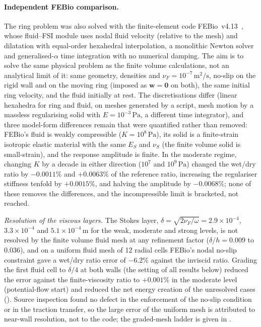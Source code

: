 \paragraph{Independent FEBio comparison.}
The ring problem was also solved with the finite-element code FEBio~v4.13~\citep{Maas2012,Ateshian2018,Shim2019}, whose fluid--FSI module uses nodal fluid velocity (relative to the mesh) and dilatation with equal-order hexahedral interpolation, a monolithic Newton solver and generalised-$\alpha$ time integration with no numerical damping.
The aim is to solve the same physical problem as the finite volume calculations, not an analytical limit of it: same geometry, densities and $\nu_F=10^{-7}\,\mathrm{m^2/s}$, no-slip on the rigid wall and on the moving ring (imposed as $\bm{w}=\bm{0}$ on both), the same initial ring velocity, and the fluid initially at rest.
The discretisations differ (linear hexahedra for ring and fluid, on meshes generated by a script, mesh motion by a massless regularising solid with $E=10^{-3}\,\mathrm{Pa}$, a different time integrator), and three model-form differences remain that were quantified rather than removed: FEBio's fluid is weakly compressible ($K=10^{8}\,\mathrm{Pa}$), its solid is a finite-strain isotropic elastic material with the same $E_S$ and $\nu_S$ (the finite volume solid is small-strain), and the response amplitude is finite.
In the moderate regime, changing $K$ by a decade in either direction ($10^{7}$ and $10^{9}\,\mathrm{Pa}$) changed the wet/dry ratio by $-0.0011\%$ and $+0.0063\%$ of the reference ratio, increasing the regulariser stiffness tenfold by $+0.0015\%$, and halving the amplitude by $-0.0068\%$; none of these removes the differences, and the incompressible limit is bracketed, not reached.

\emph{Resolution of the viscous layers.}
The Stokes layer, $\delta=\sqrt{2\nu_F/\omega}=2.9\times10^{-4}$, $3.3\times10^{-4}$ and $5.1\times10^{-4}\,\mathrm{m}$ for the weak, moderate and strong levels, is not resolved by the finite volume fluid mesh at any refinement factor ($\delta/h=0.009$ to $0.036$), and on a uniform fluid mesh of 12 radial cells FEBio's nodal no-slip constraint gave a wet/dry ratio error of $-6.2\%$ against the inviscid ratio.
Grading the first fluid cell to $\delta/4$ at both walls (the setting of all results below) reduced the error against the finite-viscosity ratio to $+0.001\%$ in the moderate level (potential-flow start) and reduced the net energy creation of the unresolved cases (\suppRef).
Source inspection found no defect in the enforcement of the no-slip condition or in the traction transfer, so the large error of the uniform mesh is attributed to near-wall resolution, not to the code; the graded-mesh ladder is given in \suppRef.

